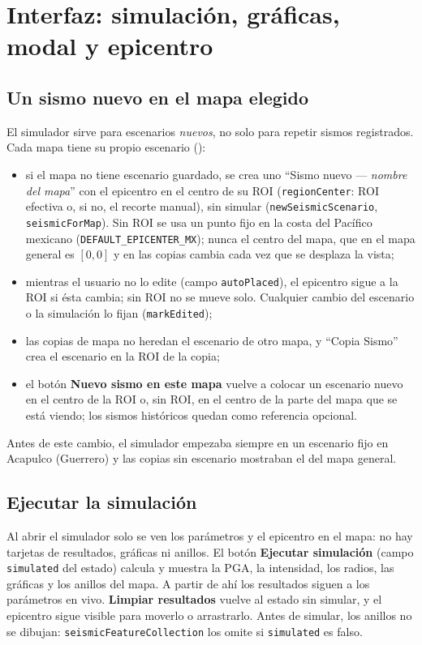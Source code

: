\documentclass[11pt,a4paper]{article}
\begin{document}
\section{Interfaz: simulación, gráficas, modal y epicentro}

\subsection{Un sismo nuevo en el mapa elegido}
El simulador sirve para escenarios \emph{nuevos}, no solo para repetir sismos registrados. Cada mapa
tiene su propio escenario ():
\begin{itemize}
  \item si el mapa no tiene escenario guardado, se crea uno ``Sismo nuevo --- \emph{nombre del mapa}''
        con el epicentro en el centro de su ROI (\texttt{regionCenter}: ROI efectiva o, si no, el recorte
        manual), sin simular (\texttt{newSeismicScenario}, \texttt{seismicForMap}). Sin ROI se usa un
        punto fijo en la costa del Pacífico mexicano (\texttt{DEFAULT\_EPICENTER\_MX}); nunca el centro del
        mapa, que en el mapa general es $[0, 0]$ y en las copias cambia cada vez que se desplaza la vista;
  \item mientras el usuario no lo edite (campo \texttt{autoPlaced}), el epicentro sigue a la ROI si ésta
        cambia; sin ROI no se mueve solo. Cualquier cambio del escenario o la simulación lo fijan
        (\texttt{markEdited});
  \item las copias de mapa no heredan el escenario de otro mapa, y ``Copia Sismo'' crea el escenario en
        la ROI de la copia;
  \item el botón \textbf{Nuevo sismo en este mapa} vuelve a colocar un escenario nuevo en el centro de la
        ROI o, sin ROI, en el centro de la parte del mapa que se está viendo; los sismos históricos
        quedan como referencia opcional.
\end{itemize}
Antes de este cambio, el simulador empezaba siempre en un escenario fijo en Acapulco (Guerrero) y las
copias sin escenario mostraban el del mapa general.

\subsection{Ejecutar la simulación}
Al abrir el simulador solo se ven los parámetros y el epicentro en el mapa: no hay tarjetas de
resultados, gráficas ni anillos. El botón \textbf{Ejecutar simulación} (campo \texttt{simulated} del
estado) calcula y muestra la PGA, la intensidad, los radios, las gráficas y los anillos del mapa. A
partir de ahí los resultados siguen a los parámetros en vivo. \textbf{Limpiar resultados} vuelve al
estado sin simular, y el epicentro sigue visible para moverlo o arrastrarlo. Antes de simular, los
anillos no se dibujan: \texttt{seismicFeatureCollection} los omite si \texttt{simulated} es falso.
\end{document}
